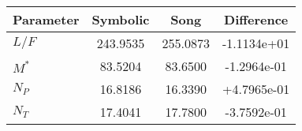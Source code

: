 \begin{tabular}{|l||c|c|c|}
\hline
\bf{Parameter} & \bf{Symbolic} & \bf{Song} & \bf{Difference} \\
\hline
$L/F$ & 243.9535 & 255.0873 & -1.1134e+01 \\
\hline
$M^*$ & 83.5204 & 83.6500 & -1.2964e-01 \\
\hline
$N_P$ & 16.8186 & 16.3390 & +4.7965e-01 \\
\hline
$N_T$ & 17.4041 & 17.7800 & -3.7592e-01 \\
\hline
\end{tabular}
